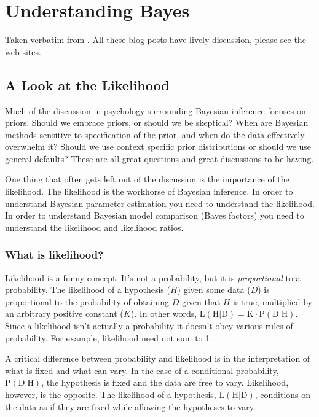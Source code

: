 
\chapter{Understanding Bayes}
\label{chap:UnderstandingBayes}


Taken verbatim from \cite{etz2015a,etz2015d,etz2015b,etz2015c,etz2016a}.
All these blog posts have lively discussion, please see the web sites.

\section{A Look at the Likelihood}
\label{sec:ALookattheLikelihood}

Much of the discussion in psychology surrounding Bayesian inference focuses on priors. Should we embrace priors, or should we be skeptical? When are Bayesian methods sensitive to specification of the prior, and when do the data effectively overwhelm it? Should we use context specific prior distributions or should we use general defaults? These are all great questions and great discussions to be having.

One thing that often gets left out of the discussion is the importance of the likelihood. The likelihood is the workhorse of Bayesian inference. In order to understand Bayesian parameter estimation you need to understand the likelihood. In order to understand Bayesian model comparison (Bayes factors) you need to understand the likelihood and likelihood ratios.

\subsection{What is likelihood?}

Likelihood is a funny concept. It's not a probability, but it is \textit{proportional} to a probability. The likelihood of a hypothesis ($H$) given some data ($D$) is proportional to the probability of obtaining $D$ given that $H$ is true, multiplied by an arbitrary positive constant ($K$). In other words, $\mathrm{L}(\mathrm{H} | \mathrm{D})=\mathrm{K} \cdot \mathrm{P}(\mathrm{D} | \mathrm{H})$. Since a likelihood isn't actually a probability it doesn't obey various rules of probability. For example, likelihood need not sum to 1.

A critical difference between probability and likelihood is in the interpretation of what is fixed and what can vary. In the case of a conditional probability, $\mathrm{P}(\mathrm{D} | \mathrm{H})$, the hypothesis is fixed and the data are free to vary. Likelihood, however, is the opposite. The likelihood of a hypothesis, $\mathrm{L}(\mathrm{H} | \mathrm{D})$, conditions on the data as if they are fixed while allowing the hypotheses to vary.

